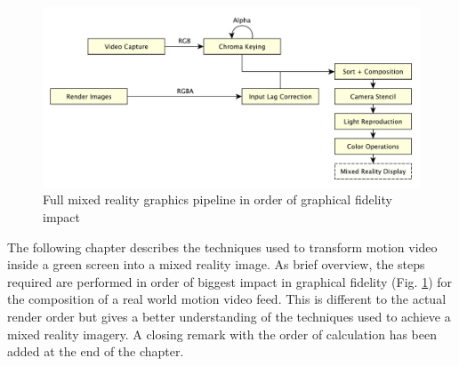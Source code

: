 \begin{figure}[htb]
	\includegraphics[width=\textwidth]{_raw_resources/pipeline_steps/4_0_pipeline.pdf}
	\caption{Full mixed reality graphics pipeline in order of graphical 
	fidelity impact}
	\label{fig:steps:pipeline}
\end{figure}

The following chapter describes the techniques used to transform motion video 
inside a green screen into a mixed reality image. As brief overview, the steps 
required are performed in order of biggest impact in graphical fidelity (Fig. 
\ref{fig:steps:pipeline}) for the composition of a real world motion video 
feed. This is different to the actual render order but gives a better 
understanding of the techniques used to achieve a mixed reality imagery. A 
closing remark with the order of calculation has been added at the end of the 
chapter.

